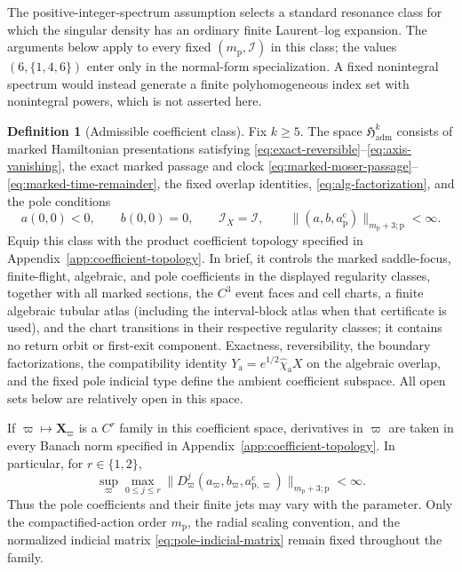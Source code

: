\documentclass[11pt]{amsart}
\numberwithin{equation}{section}
\theoremstyle{definition}
\newtheorem{definition}[theorem]{Definition}
\theoremstyle{remark}
\begin{document}
The positive-integer-spectrum assumption selects a standard resonance class
for which the singular density has an ordinary finite Laurent--log
expansion.  The arguments below apply to every fixed
$(m_{\mathrm p},\mathcal I)$ in this class; the values
$(6,\{1,4,6\})$ enter only in the normal-form specialization.  A fixed
nonintegral spectrum would instead generate a finite polyhomogeneous index
set with nonintegral powers, which is not asserted here.

\begin{definition}[Admissible coefficient class]\label{def:field-space}
Fix $k\ge5$.  The space $\mathfrak H_{\mathrm{adm}}^k$ consists of
marked Hamiltonian presentations satisfying
\eqref{eq:exact-reversible}--\eqref{eq:axis-vanishing},
the exact marked passage and clock
\eqref{eq:marked-moser-passage}--\eqref{eq:marked-time-remainder},
the fixed overlap identities, \eqref{eq:alg-factorization}, and the pole
conditions
\begin{equation}\label{eq:pole-principal-class}
 a(0,0)<0,\qquad b(0,0)=0,\qquad
 \mathcal I_X=\mathcal I,\qquad
 \|(a,b,a_{\mathrm p}^{\mathrm c})
       \|_{m_{\mathrm p}+3;\mathrm p}<\infty.
\end{equation}
Equip this class with the product coefficient topology specified in
Appendix~\ref{app:coefficient-topology}.  In brief, it controls the marked
saddle-focus, finite-flight, algebraic, and pole coefficients in the
displayed regularity classes, together with all marked sections, the
$C^3$ event faces and cell charts, a finite algebraic tubular atlas
(including the interval-block atlas when that certificate is used), and
the chart transitions in their respective regularity classes;
it contains no return orbit or first-exit
component.  Exactness, reversibility, the boundary
factorizations, the compatibility identity
$Y_{\mathrm a}=e^{1/2}\widehat\chi_{\mathrm a}X$ on the algebraic overlap,
and the fixed pole indicial type define the ambient coefficient subspace.
All open sets below are relatively open in this space.

If $\varpi\mapsto\mathbf X_\varpi$ is a $C^r$ family in this coefficient
space, derivatives in $\varpi$ are taken in every Banach norm specified in
Appendix~\ref{app:coefficient-topology}.
In particular, for $r\in\{1,2\}$,
\begin{equation}\label{eq:pole-parameter-class}
 \sup_\varpi\max_{0\le j\le r}
 \|D_\varpi^j(a_\varpi,b_\varpi,
       a_{\mathrm p,\varpi}^{\mathrm c})
       \|_{m_{\mathrm p}+3;\mathrm p}<\infty.
\end{equation}
Thus the pole coefficients and their finite jets may vary with the
parameter.  Only the compactified-action order $m_{\mathrm p}$, the radial
scaling convention, and the normalized indicial matrix
\eqref{eq:pole-indicial-matrix} remain fixed throughout the family.
\end{definition}
\end{document}
